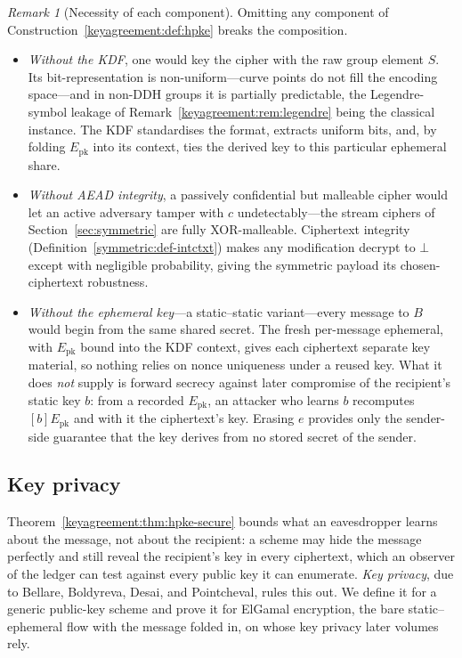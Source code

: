 \documentclass[11pt,a4paper]{article}
\theoremstyle{definition}
\theoremstyle{remark}
\newtheorem{remark}[theorem]{Remark}
\begin{document}
\begin{remark}[Necessity of each component]
\label{keyagreement:rem:necessary}
Omitting any component of Construction~\ref{keyagreement:def:hpke}
breaks the composition.
\begin{itemize}
\item \emph{Without the KDF}, one would key the cipher with the raw
  group element \(S\). Its bit-representation is non-uniform---curve
  points do not fill the encoding space---and in non-DDH groups it is
  partially predictable, the Legendre-symbol leakage of
  Remark~\ref{keyagreement:rem:legendre} being the classical
  instance. The KDF standardises the format, extracts uniform bits,
  and, by folding \(E_{\mathrm{pk}}\) into its context, ties the
  derived key to this particular ephemeral share.
\item \emph{Without AEAD integrity}, a passively confidential but
  malleable cipher would let an active adversary tamper with \(c\)
  undetectably---the stream ciphers of
  Section~\ref{sec:symmetric} are fully XOR-malleable. Ciphertext
  integrity (Definition~\ref{symmetric:def-intctxt}) makes any
  modification decrypt to \(\bot\) except with negligible
  probability, giving the symmetric payload its chosen-ciphertext
  robustness.
\item \emph{Without the ephemeral key}---a static--static
  variant---every message to \(B\) would begin from the same shared
  secret. The fresh per-message ephemeral, with \(E_{\mathrm{pk}}\)
  bound into the KDF context, gives each ciphertext separate key
  material, so nothing relies on nonce uniqueness under a reused
  key. What it does \emph{not} supply is forward secrecy against
  later compromise of the recipient's static key \(b\): from a
  recorded \(E_{\mathrm{pk}}\), an attacker who learns \(b\)
  recomputes \([b]E_{\mathrm{pk}}\) and with it the ciphertext's
  key. Erasing \(e\) provides only the sender-side guarantee that the
  key derives from no stored secret of the sender.
\end{itemize}
\end{remark}

\subsection{Key privacy}
\label{keyagreement:subsec:keyprivacy}

Theorem~\ref{keyagreement:thm:hpke-secure} bounds what an eavesdropper
learns about the message, not about the recipient: a scheme may hide
the message perfectly and still reveal the recipient's key in every
ciphertext, which an observer of the ledger can test against every public
key it can enumerate. \emph{Key privacy}, due to Bellare, Boldyreva,
Desai, and Pointcheval, rules this out. We define it for a generic
public-key scheme and prove it for ElGamal encryption, the bare
static--ephemeral flow with the message folded in, on whose key
privacy later volumes rely.
\end{document}
